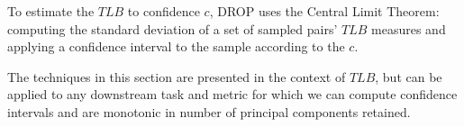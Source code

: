 To estimate the $TLB$ to confidence $c$, DROP uses the Central Limit Theorem: computing the standard deviation of a set of sampled pairs' $TLB$ measures and applying a confidence interval to the sample according to the $c$.

The techniques in this section are presented in the context of $TLB$, but can be applied to any downstream task and metric for which we can compute confidence intervals and are monotonic in number of principal components retained.

